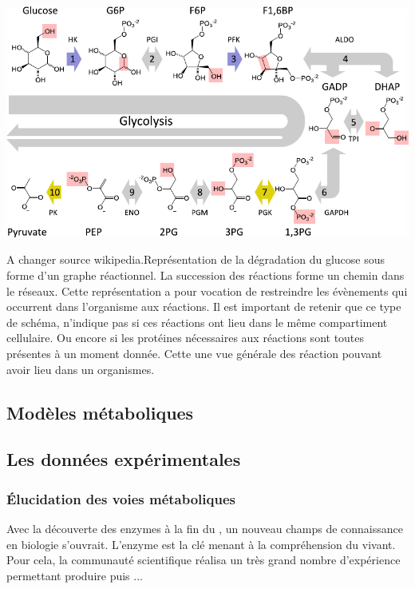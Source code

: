 \begin{refsection}
    
    \begin{shadedfigure}
        \centering
        \includegraphics[width=\textwidth]{img/graphe_reactions_glycolyse.pdf}
        \caption{A changer source wikipedia.Représentation de la dégradation du glucose sous forme d’un graphe réactionnel. La  succession des réactions forme un chemin dans le réseaux. Cette représentation a pour vocation de restreindre les évènements qui occurrent dans l'organisme aux réactions. Il est important de retenir que ce type de schéma, n'indique pas si ces réactions ont lieu dans le même compartiment cellulaire. Ou encore si les protéines nécessaires aux réactions sont toutes présentes à un moment donnée. Cette une vue générale des réaction pouvant avoir lieu dans un organismes.  }
        \label{fig:glycolysis}
    \end{shadedfigure}

    \subsection{Modèles métaboliques}
    \subsection{Les données expérimentales}
    \subsubsection{Élucidation des voies métaboliques}
    Avec la découverte des enzymes à la fin du , un nouveau champs de connaissance en biologie s’ouvrait. L’enzyme est la clé menant à la compréhension du vivant. Pour cela, la communauté scientifique réalisa un très grand nombre d’expérience permettant produire puis ...

\end{refsection}
